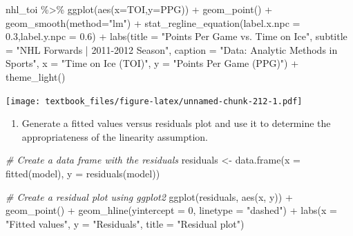 \documentclass[
  11pt,
]{book}
\newenvironment{Shaded}{\begin{snugshade}}{\end{snugshade}}
\newcommand{\AttributeTok}[1]{\textcolor[rgb]{0.77,0.63,0.00}{#1}}
\newcommand{\CommentTok}[1]{\textcolor[rgb]{0.56,0.35,0.01}{\textit{#1}}}
\newcommand{\DecValTok}[1]{\textcolor[rgb]{0.00,0.00,0.81}{#1}}
\newcommand{\FloatTok}[1]{\textcolor[rgb]{0.00,0.00,0.81}{#1}}
\newcommand{\FunctionTok}[1]{\textcolor[rgb]{0.00,0.00,0.00}{#1}}
\newcommand{\NormalTok}[1]{#1}
\newcommand{\OtherTok}[1]{\textcolor[rgb]{0.56,0.35,0.01}{#1}}
\newcommand{\SpecialCharTok}[1]{\textcolor[rgb]{0.00,0.00,0.00}{#1}}
\newcommand{\StringTok}[1]{\textcolor[rgb]{0.31,0.60,0.02}{#1}}
\providecommand{\tightlist}{%
  \setlength{\itemsep}{0pt}\setlength{\parskip}{0pt}}
\theoremstyle{definition}
\theoremstyle{definition}
\theoremstyle{definition}
\theoremstyle{definition}
\theoremstyle{remark}
\begin{document}
\begin{Shaded}
\begin{Highlighting}[]
\NormalTok{nhl\_toi }\SpecialCharTok{\%\textgreater{}\%} \FunctionTok{ggplot}\NormalTok{(}\FunctionTok{aes}\NormalTok{(}\AttributeTok{x=}\NormalTok{TOI,}\AttributeTok{y=}\NormalTok{PPG)) }\SpecialCharTok{+}
  \FunctionTok{geom\_point}\NormalTok{() }\SpecialCharTok{+}
  \FunctionTok{geom\_smooth}\NormalTok{(}\AttributeTok{method=}\StringTok{"lm"}\NormalTok{) }\SpecialCharTok{+} 
  \FunctionTok{stat\_regline\_equation}\NormalTok{(}\AttributeTok{label.x.npc =} \FloatTok{0.3}\NormalTok{,}\AttributeTok{label.y.npc =} \FloatTok{0.6}\NormalTok{) }\SpecialCharTok{+}
  \FunctionTok{labs}\NormalTok{(}\AttributeTok{title =} \StringTok{"Points Per Game vs. Time on Ice"}\NormalTok{,}
       \AttributeTok{subtitle =} \StringTok{"NHL Forwards | 2011{-}2012 Season"}\NormalTok{,}
       \AttributeTok{caption =} \StringTok{"Data: Analytic Methods in Sports"}\NormalTok{, }
       \AttributeTok{x =} \StringTok{"Time on Ice (TOI)"}\NormalTok{,}
       \AttributeTok{y =} \StringTok{"Points Per Game (PPG)"}\NormalTok{) }\SpecialCharTok{+}
  \FunctionTok{theme\_light}\NormalTok{()}
\end{Highlighting}
\end{Shaded}

\texttt{[image: textbook\_files/figure-latex/unnamed-chunk-212-1.pdf]}

\newpage

\begin{enumerate}
\def\labelenumi{(\alph{enumi})}
\setcounter{enumi}{3}
\tightlist
\item
  Generate a fitted values versus residuals plot and use it to determine the appropriateness of the linearity assumption.
\end{enumerate}

\begin{Shaded}
\begin{Highlighting}[]
\CommentTok{\# Create a data frame with the residuals}
\NormalTok{residuals }\OtherTok{\textless{}{-}} \FunctionTok{data.frame}\NormalTok{(}\AttributeTok{x =} \FunctionTok{fitted}\NormalTok{(model), }\AttributeTok{y =} \FunctionTok{residuals}\NormalTok{(model))}

\CommentTok{\# Create a residual plot using ggplot2}
\FunctionTok{ggplot}\NormalTok{(residuals, }\FunctionTok{aes}\NormalTok{(x, y)) }\SpecialCharTok{+}
  \FunctionTok{geom\_point}\NormalTok{() }\SpecialCharTok{+}
  \FunctionTok{geom\_hline}\NormalTok{(}\AttributeTok{yintercept =} \DecValTok{0}\NormalTok{, }\AttributeTok{linetype =} \StringTok{"dashed"}\NormalTok{) }\SpecialCharTok{+}
  \FunctionTok{labs}\NormalTok{(}\AttributeTok{x =} \StringTok{"Fitted values"}\NormalTok{, }\AttributeTok{y =} \StringTok{"Residuals"}\NormalTok{, }\AttributeTok{title =} \StringTok{"Residual plot"}\NormalTok{)}
\end{Highlighting}
\end{Shaded}
\end{document}
